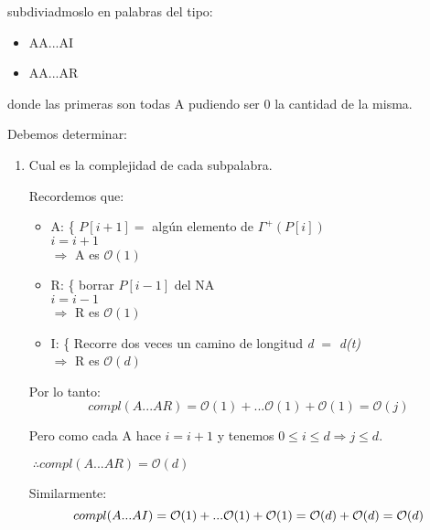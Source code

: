 \documentclass[12pt,a4paper]{report}
\begin{document}
		subdiviadmoslo en palabras del tipo:
		\begin{center}
			\begin{itemize}
				\item AA...AI
				\item AA...AR
			\end{itemize}
		\end{center}
		
		donde las primeras son todas A pudiendo ser 0 la cantidad de la misma.
		
		Debemos determinar:
		\begin{enumerate}
			\item Cual es la complejidad de cada subpalabra.
				
				Recordemos que:
		\begin{itemize}
			\item A:  \{ $P[i+1] =$ algún elemento de $\Gamma^{+}(P[i])$ \\
						  $i = i+1$ \\
						$\Rightarrow$ A es $\mathcal{O}(1)$
						
			\item R: \{ borrar $P[i-1]$ del NA \\
						  $i = i-1$ \\
						$\Rightarrow$ R es $\mathcal{O}(1)$
						
			\item I: \{ Recorre dos veces un camino de longitud \textit{d} $=$ \textit{d(\textit{t})} \\
						$\Rightarrow$ R es $\mathcal{O}(\textit{d})$
		\end{itemize}
		
		Por lo tanto:
		\begin{equation}
			compl(A...AR) = \mathcal{O}(1) + ... \mathcal{O}(1) + \mathcal{O}(1)
									= \mathcal{O}(j)
		\end{equation}
		
		Pero como cada A hace $ i = i+1$ y tenemos $ 0 \leq \textit{i} \leq \textit{d} \Rightarrow \textit{j} \leq \textit{d}.$
		
		\begin{center}
			$ \; \therefore compl(A...AR) = \mathcal{O}(\textit{d})$
		\end{center}
		
		Similarmente: 		
		\begin{equation}
			compl(A...AI) = \mathcal{O}(1) + ... \mathcal{O}(1) + \mathcal{O}(1) \\
									= \mathcal{O}(d) + \mathcal{O}(d) \\
									= \mathcal{O}(d)
		\end{equation}
		

\end{enumerate}
\end{document}
